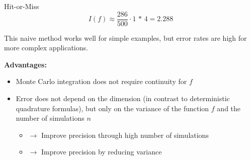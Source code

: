 \documentclass[11pt,compress,t,notes=noshow, xcolor=table]{beamer}
\begin{document}
\begin{vbframe}{Hit-or-Miss}
\normalsize
$$
  I(f) \approx \frac{286}{500} \cdot \text{1 * 4} = 2.288
$$

This naive method works well for simple examples, but error rates are high for more complex applications.

\framebreak






%
%
%
%
%
%
%
%
%
%
%
%
%
%
%
%
%

\framebreak

\textbf{Advantages:}
\begin{itemize}
\item Monte Carlo integration does not require continuity for $f$
\item Error does not depend on the dimension (in contrast to deterministic quadrature formulas), but only on the variance of the function $f$ and the number of simulations $n$
\begin{itemize}
\item $\to$ Improve precision through high number of simulations
\item $\to$ Improve precision by reducing variance
\end{itemize}
\end{itemize}


\end{vbframe}
\end{document}
